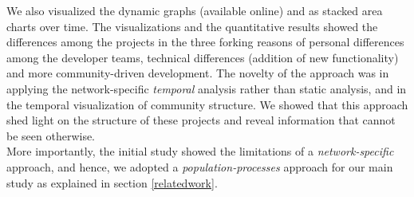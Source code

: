 \documentclass[11pt]{report}
\begin{document}
\begin{appendices}
We also visualized the dynamic graphs (available online) and as stacked area charts over time. The visualizations and the quantitative results showed the differences among the projects in the three forking reasons of personal differences among the developer teams, technical differences (addition of new functionality) and more community-driven development. The novelty of the approach was in applying the network-specific \textit{temporal} analysis rather than static analysis, and in the temporal visualization of community structure. We showed that this approach shed light on the structure of these projects and reveal information that cannot be seen otherwise.\\

More importantly, the initial study showed the limitations of a \textit{network-specific} approach, and hence, we adopted a \textit{population-processes} approach for our main study as explained in section \ref{relatedwork}.

\end{appendices}

\pagebreak





  

%
%
\end{document}
